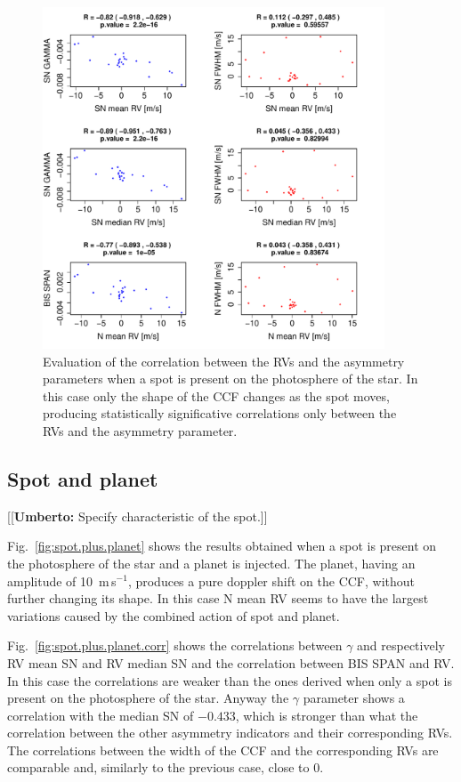 \documentclass[11pt, oneside]{article}
\def\ms{\hbox{\,m\,s$^{-1}$}}         %
\newcommand{\umberto}[1]{{\color{green}[[\textbf{Umberto: }#1]]}}
\begin{document}
\begin{figure}[htbp]
   \centering
\includegraphics[height = 4in]{SOAP_SPOT_Comparison_para_SN.pdf} 
   \caption{Evaluation of the correlation between the RVs and the asymmetry parameters when a spot is present on the photosphere of the star. In this case only the shape of the CCF changes as the spot moves, producing statistically significative correlations only between the RVs and the asymmetry parameter.}
    \label{fig:spot.corr}
\end{figure}

\subsection{Spot and planet} \label{sec:soap.spot.planet}

\umberto{Specify characteristic of the spot.}

Fig.~\ref{fig:spot.plus.planet} shows the results obtained when a spot is present on the photosphere of the star and a planet is injected. The planet, having an amplitude of 10 \ms, produces a pure doppler shift on the CCF, without further changing its shape.  In this case N mean RV seems to have the largest variations caused by the combined action of spot and planet. %

Fig.~\ref{fig:spot.plus.planet.corr} shows the correlations between $\gamma$ and respectively RV mean SN and RV median SN and the correlation between BIS SPAN and RV. In this case the correlations are weaker than the ones derived when only a spot is present on the photosphere of the star. Anyway the $\gamma$ parameter shows a correlation with the median SN of $-0.433$, which is stronger than what the correlation between the other asymmetry indicators and their corresponding RVs. The correlations between the width of the CCF and the corresponding RVs are comparable and, similarly to the previous case, close to $0$.
\end{document}
